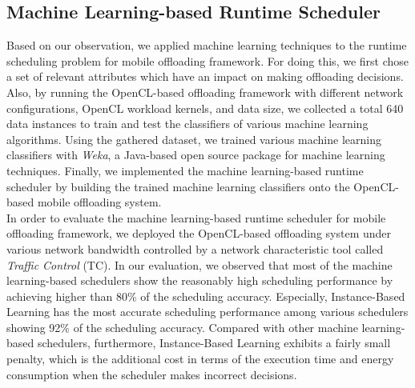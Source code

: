 \documentclass[10pt, conference, compsocconf]{IEEEtran}
\begin{document}
\subsection{Machine Learning-based Runtime Scheduler}
%
Based on our observation, we applied machine learning techniques to the
runtime scheduling problem for mobile offloading framework.
%
For doing this, we first chose a set of relevant attributes which have
an impact on making offloading decisions.
%
Also, by running the OpenCL-based offloading framework with different
network configurations, OpenCL workload kernels, and data size, we
collected a total 640 data instances to train and test the classifiers
of various machine learning algorithms.
%
Using the gathered dataset, we trained various machine learning
classifiers with \textit{Weka}, a Java-based open source package for
machine learning techniques.
%
Finally, we implemented the machine learning-based runtime scheduler by
building the trained machine learning classifiers onto the
OpenCL-based mobile offloading system.\\
%
\indent In order to evaluate the machine learning-based runtime
scheduler for mobile offloading framework, we deployed the OpenCL-based
offloading system under various network bandwidth controlled by a
network characteristic tool called \textit{Traffic Control} (TC).
%
In our evaluation, we observed that most of the machine learning-based
schedulers show the reasonably high scheduling performance by achieving
higher than 80\% of the scheduling accuracy.
%
Especially, Instance-Based Learning has the most accurate scheduling
performance among various schedulers showing 92\% of the scheduling
accuracy.
%
Compared with other machine learning-based schedulers, furthermore,
Instance-Based Learning exhibits a fairly small penalty, which is the
additional cost in terms of the execution time and energy consumption
when the scheduler makes incorrect decisions.
%
%
%
%
%
\end{document}
